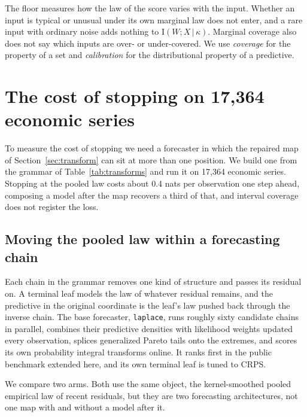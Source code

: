 \documentclass[11pt]{article}
\theoremstyle{remark}
\newcommand{\I}{\mathrm{I}}
\newcommand{\given}{\,|\,}
\begin{document}
The floor measures how the law of the score varies with the input. Whether an input
is typical or unusual under its own marginal law does not enter, and a rare input with
ordinary noise adds nothing to $\I(W;X\given\kappa)$. Marginal coverage also does not
say which inputs are over- or under-covered. We use \emph{coverage} for the property of
a set and \emph{calibration} for the distributional property of a predictive.

\section{The cost of stopping on 17{,}364 economic series}\label{sec:price}

To measure the cost of stopping we need a forecaster in which the repaired map of
Section~\ref{sec:transform} can sit at more than one position. We build one from
the grammar of Table~\ref{tab:transforms} and run it on 17{,}364 economic series.
Stopping at the pooled law costs about 0.4 nats per observation one step ahead,
composing a model after the map recovers a third of that, and interval coverage
does not register the loss.

\subsection{Moving the pooled law within a forecasting chain}\label{sec:grammar}

Each chain in the grammar removes one kind of structure and passes its residual on.
A terminal leaf models the law of whatever residual remains, and the predictive in
the original coordinate is the leaf's law pushed back through the inverse chain.
The base forecaster, \texttt{laplace}, runs roughly sixty candidate chains in
parallel, combines their predictive densities with likelihood weights updated
every observation, splices generalized Pareto tails onto the extremes, and
scores its own probability integral transforms online. It ranks first in the
public benchmark extended here, and its own terminal leaf is tuned to
CRPS.

We compare two arms. Both use the same object, the kernel-smoothed pooled
empirical law of recent residuals, but they are two forecasting architectures, not one
map with and without a model after it.
\end{document}
